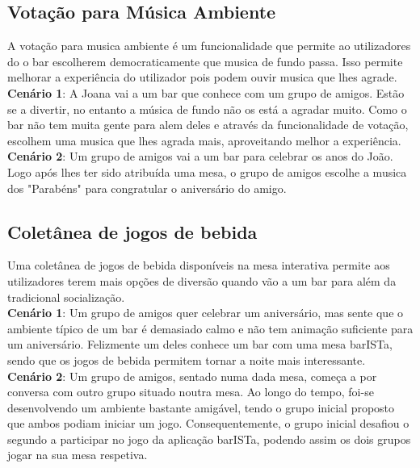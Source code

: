 \documentclass{article}
\begin{document}
\subsection*{Votação para Música Ambiente}
A votação para musica ambiente é um funcionalidade que permite ao utilizadores do o bar escolherem democraticamente que musica de fundo passa. Isso permite melhorar a experiência do utilizador pois podem ouvir musica que lhes agrade.\\
\textbf{Cenário 1}: A Joana vai a um bar que conhece com um grupo de amigos. Estão se a divertir, no entanto a música de fundo não os está a agradar muito. Como o bar não tem muita gente para alem deles e através da funcionalidade de votação, escolhem uma musica que lhes agrada mais, aproveitando melhor a experiência.\\

\textbf{Cenário 2}: Um grupo de amigos vai a um bar para celebrar os anos do João. Logo após lhes ter sido atribuída uma mesa, o grupo de amigos escolhe a musica dos "Parabéns" para congratular o aniversário do amigo.

\subsection*{Coletânea de jogos de bebida}
Uma coletânea de jogos de bebida disponíveis na mesa interativa permite aos utilizadores terem mais opções de diversão quando vão a um bar para além da tradicional socialização.\\
\textbf{Cenário 1}: Um grupo de amigos quer celebrar um aniversário, mas sente que o ambiente típico de um bar é demasiado calmo e não tem animação suficiente para um aniversário. Felizmente um deles conhece um bar com uma mesa barISTa, sendo que os jogos de bebida permitem tornar a noite mais interessante.\\
\textbf{Cenário 2}: Um grupo de amigos, sentado numa dada mesa, começa a por conversa com outro grupo situado noutra mesa. Ao longo do tempo, foi-se desenvolvendo um ambiente bastante amigável, tendo o grupo inicial proposto que ambos podiam iniciar um jogo. Consequentemente, o grupo inicial desafiou o segundo a participar no jogo da aplicação barISTa, podendo assim os dois grupos jogar na sua mesa respetiva.
\end{document}
